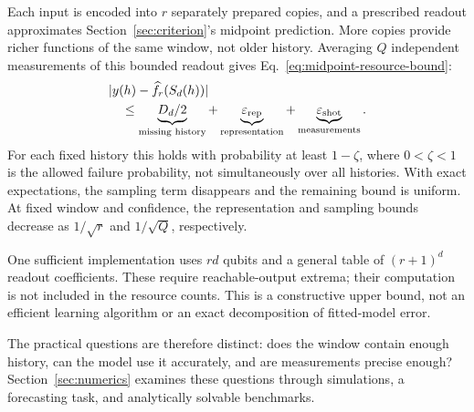 Each input is encoded into $r$ separately prepared copies, and a prescribed
readout approximates Section~\ref{sec:criterion}'s midpoint prediction.
More copies provide richer functions of the same window, not older history.
Averaging $Q$ independent measurements of this bounded readout gives
Eq.~\eqref{eq:midpoint-resource-bound}:
\[
 \begin{aligned}
 &|y(h)-\widehat f_r(S_d(h))|\\
 &\quad\leq\underbrace{D_d/2}_{\text{missing history}}
 +\underbrace{\varepsilon_{\rm rep}}_{\text{representation}}
 +\underbrace{\varepsilon_{\rm shot}}_{\text{measurements}}.
 \end{aligned}
\]
For each fixed history this holds with probability at least $1-\zeta$,
where $0<\zeta<1$ is the allowed failure probability, not simultaneously
over all histories. With exact expectations, the sampling term disappears
and the remaining bound is uniform. At fixed window and confidence, the
representation and sampling bounds decrease as $1/\sqrt r$ and
$1/\sqrt Q$, respectively.

One sufficient implementation uses $rd$ qubits and a general table of
$(r+1)^d$ readout coefficients. These require reachable-output extrema;
their computation is not included in the resource counts. This is a
constructive upper bound, not an efficient learning algorithm or an exact
decomposition of fitted-model error.

The practical questions are therefore distinct: does the window contain
enough history, can the model use it accurately, and are measurements
precise enough? Section~\ref{sec:numerics} examines these questions through
simulations, a forecasting task, and analytically solvable benchmarks.

